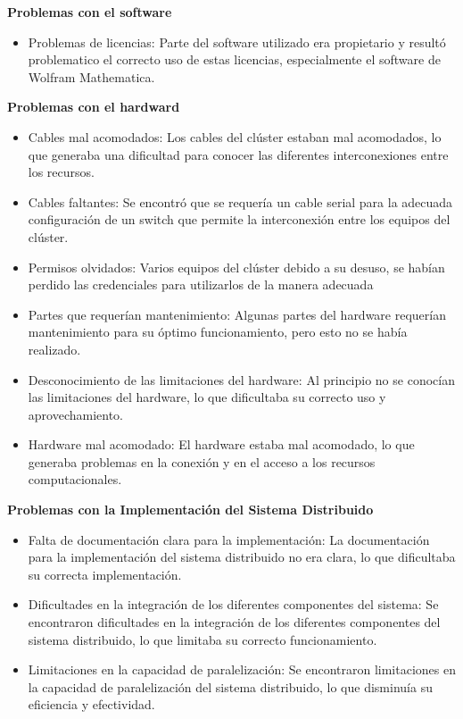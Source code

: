 \begin{spacing}{1.5}
    \textbf{Problemas con el software}

    \begin{itemize}
        \item Problemas de licencias: Parte del software utilizado era propietario y resultó problematico el correcto uso de estas licencias, especialmente el software de Wolfram Mathematica.
    \end{itemize}


    \textbf{Problemas con el hardward}

    \begin{itemize}
        \item Cables mal acomodados: Los cables del clúster estaban mal acomodados, lo que generaba una dificultad para conocer las diferentes interconexiones entre los recursos.
        \item Cables faltantes: Se encontró que se requería un cable serial para la adecuada configuración de un switch que permite la interconexión entre los equipos del clúster.
        \item Permisos olvidados: Varios equipos del clúster debido a su desuso, se habían perdido las credenciales para utilizarlos de la manera adecuada
        \item Partes que requerían mantenimiento: Algunas partes del hardware requerían mantenimiento para su óptimo funcionamiento, pero esto no se había realizado.
        \item Desconocimiento de las limitaciones del hardware: Al principio no se conocían las limitaciones del hardware, lo que dificultaba su correcto uso y aprovechamiento.
        \item Hardware mal acomodado: El hardware estaba mal acomodado, lo que generaba problemas en la conexión y en el acceso a los recursos computacionales.
    \end{itemize}

    \textbf{Problemas con la Implementación del Sistema Distribuido}

    \begin{itemize}
        \item Falta de documentación clara para la implementación: La documentación para la implementación del sistema distribuido no era clara, lo que dificultaba su correcta implementación.
        \item Dificultades en la integración de los diferentes componentes del sistema: Se encontraron dificultades en la integración de los diferentes componentes del sistema distribuido, lo que limitaba su correcto funcionamiento.
        \item Limitaciones en la capacidad de paralelización: Se encontraron limitaciones en la capacidad de paralelización del sistema distribuido, lo que disminuía su eficiencia y efectividad.
    \end{itemize}


\end{spacing}
